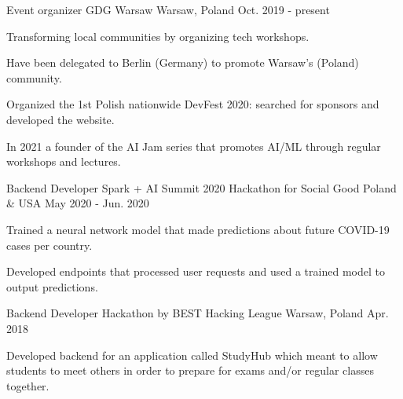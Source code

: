 

\begin{cventries}

  \cventry
    {Event organizer} %
    {GDG Warsaw} %
    {Warsaw, Poland} %
    {Oct. 2019 - present} %
    {
      \begin{cvitems} %
        \item {Transforming local communities by organizing tech workshops.}
        \item {Have been delegated to Berlin (Germany) to promote Warsaw’s (Poland) community.}
        \item {Organized the 1st Polish nationwide DevFest 2020: searched for sponsors and developed the website.}
        \item {In 2021 a founder of the AI Jam series that promotes AI/ML through regular workshops and lectures.}
      \end{cvitems}
    }

  \cventry
    {Backend Developer} %
    {Spark + AI Summit 2020 Hackathon for Social Good} %
    {Poland \& USA} %
    {May 2020 - Jun. 2020} %
    {
      \begin{cvitems} %
        \item {Trained a neural network model that made predictions about future COVID-19 cases per country.}
        \item {Developed endpoints that processed user requests and used a trained model to output predictions.}
      \end{cvitems}
    }

  \cventry
    {Backend Developer} %
    {Hackathon by BEST Hacking League} %
    {Warsaw, Poland} %
    {Apr. 2018} %
    {
      \begin{cvitems} %
        \item {Developed backend for an application called StudyHub which meant to allow students to meet others in order to prepare for exams and/or regular classes together.}
      \end{cvitems}
    }

\end{cventries}
